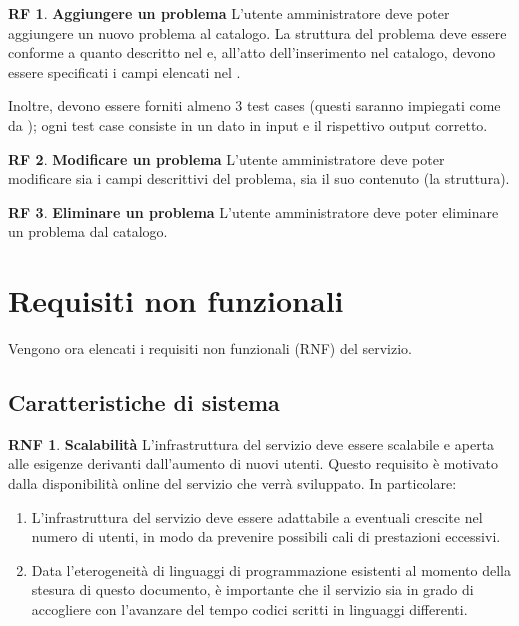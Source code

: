 \documentclass[11pt, a4paper]{article}
\theoremstyle{definition}
\newtheorem{funcreq}{RF} %
\newtheorem{nonfuncreq}{RNF} %
\begin{document}
\begin{funcreq}
\textbf{Aggiungere un problema }
L'utente amministratore deve poter aggiungere un nuovo problema al catalogo.
La struttura del problema deve essere conforme a quanto descritto nel
\textcolor{blue}{}
e, all'atto dell'inserimento nel catalogo, devono essere specificati i campi
elencati nel \textcolor{blue}{}.

Inoltre, devono essere forniti almeno 3 test cases (questi saranno impiegati
come da \textcolor{blue}{});
ogni test case consiste in un dato in input e il rispettivo output corretto.
\end{funcreq}

\begin{funcreq}
\textbf{Modificare un problema }
L'utente amministratore deve poter modificare sia i campi descrittivi del
problema, sia il suo contenuto (la struttura).
\end{funcreq}

\begin{funcreq}
\textbf{Eliminare un problema }
L'utente amministratore deve poter eliminare un problema dal catalogo.
\end{funcreq}

\newpage
\section{Requisiti non funzionali}
Vengono ora elencati i requisiti non funzionali (RNF) del servizio.

\subsection{Caratteristiche di sistema}

\begin{nonfuncreq}
\label{scalabilita}
\textbf{Scalabilità }
L'infrastruttura del servizio deve essere scalabile e aperta alle esigenze
derivanti dall'aumento di nuovi utenti. Questo requisito è motivato dalla
disponibilità online del servizio che verrà sviluppato. In particolare:
\begin{enumerate}
    \item L'infrastruttura del servizio deve essere adattabile a eventuali
    crescite nel numero di utenti, in modo da prevenire possibili cali di
    prestazioni eccessivi.

    \item Data l'eterogeneità di linguaggi di programmazione esistenti
    al momento della stesura di questo documento, è importante che il
    servizio sia in grado di accogliere con l'avanzare del tempo codici
    scritti in linguaggi differenti.
\end{enumerate}
\end{nonfuncreq}
\end{document}
